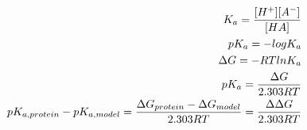 \documentclass{article}
\begin{document}
\begin{eqnarray}
	&& K_a= {[H^+][A^-] \over [HA]} \\
	&& pK_a= -logK_a \\
	&& \Delta G = -RT ln K_a  \\
	&& pK_a = {\Delta G \over 2.303RT} \\
	&& pK_{a,protein} - pK_{a,model} = {\Delta G_{protein} - \Delta G_{model} \over 2.303RT} = {\Delta \Delta G \over 2.303RT}
  \label{eqn:pka}
\end{eqnarray}
\end{document}
